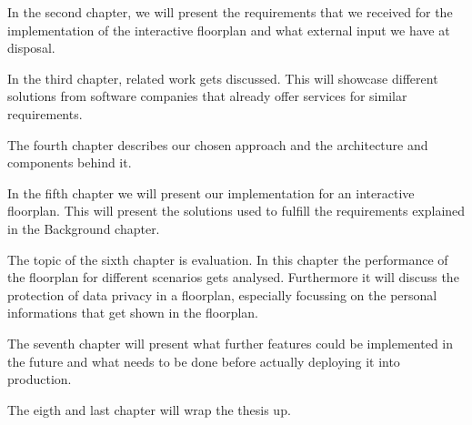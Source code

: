 In the second chapter, we will present the requirements that we received for the implementation of the interactive floorplan and what external input we have at disposal.

In the third chapter, related work gets discussed. This will showcase different solutions from software companies that already offer services for similar requirements.

The fourth chapter describes our chosen approach and the architecture and components behind it.

In the fifth chapter we will present our implementation for an interactive floorplan. This will present the solutions used to fulfill the requirements explained in the Background chapter.

The topic of the sixth chapter is evaluation. In this chapter the performance of the floorplan for different scenarios gets analysed. Furthermore it will discuss the protection of data privacy in a floorplan, especially focussing on the personal informations that get shown in the floorplan.

The seventh chapter will present what further features could be implemented in the future and what needs to be done before actually deploying it into production. 

The eigth and last chapter will wrap the thesis up.

\clearpage